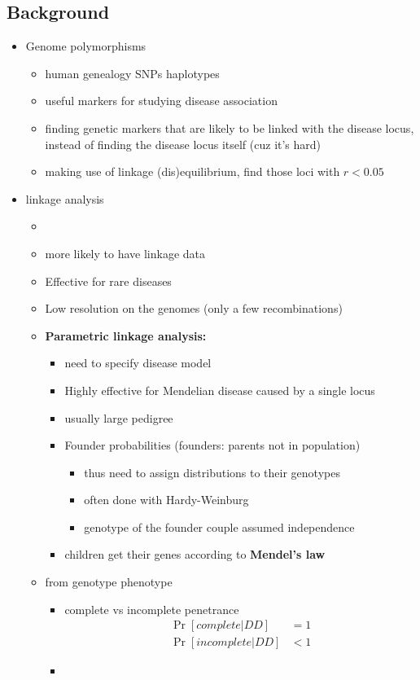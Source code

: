 \documentclass[font=12pt]{article}
\begin{document}
\subsection{Background}
\begin{itemize}
	\item Genome polymorphisms
	\begin{itemize}
		\item human genealogy \imp SNPs \imp haplotypes
		\item useful markers for studying disease association
		\item finding genetic markers that are likely to be linked with the disease locus, instead of finding the disease locus itself (cuz it's hard)
		\item making use of linkage (dis)equilibrium, find those loci with $ r < 0.05 $
	\end{itemize}
	\item linkage analysis
	\begin{itemize}
		\item {}
		\item more likely to have linkage data
		\item Effective for rare diseases
		\item Low resolution on the genomes (only a few recombinations)
		\item \textbf{Parametric linkage analysis:}
		\begin{itemize}
			\item need to specify disease model
			\item Highly effective for Mendelian disease caused by a single locus
			\item usually large pedigree
			\item Founder probabilities (founders: parents not in population)
			\begin{itemize}
				\item thus need to assign distributions to their genotypes
				\item often done with Hardy-Weinburg
				\item genotype of the founder couple assumed independence
			\end{itemize}
			\item children get their genes according to \textbf{Mendel's law}
		\end{itemize}
			\item from genotype \imp phenotype
			\begin{itemize}
				\item complete vs incomplete penetrance
				\begin{align*}
					\Pr{[complete | DD]} &= 1\\
					\Pr{[incomplete | DD]} &< 1
				\end{align*}
			\item 
			\end{itemize}
	\end{itemize}
\end{itemize}
\end{document}
